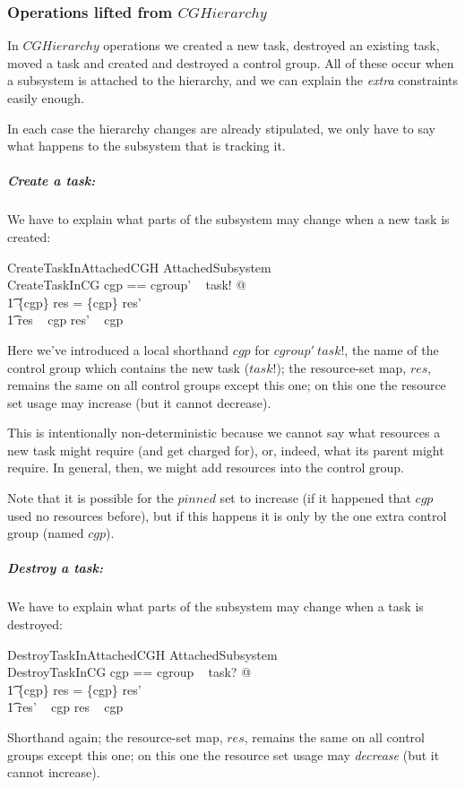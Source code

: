 \documentclass[a4paper,twoside,12pt]{article}
\begin{document}
\subsubsection{Operations lifted from $CGHierarchy$}

In $CGHierarchy$ operations we created a new task, destroyed an existing task, moved a task and created and destroyed
a control group.  All of these occur when a subsystem is attached to the hierarchy, and we can explain the \emph{extra}
constraints easily enough.

In each case the hierarchy changes are already stipulated, we only have to say what happens to the subsystem that is
tracking it.

\subparagraph{Create a task:}
We have to explain what parts of the subsystem may change when a new task is created:

\begin{schema}{CreateTaskInAttachedCGH}
\Delta AttachedSubsystem \\
CreateTaskInCG
\where
\LET cgp == cgroup' ~ task! @ \\
\t1 \{cgp\} \ndres res = \{cgp\} \ndres res' \land \\
\t1 res ~ cgp \subseteq res' ~ cgp
\end{schema}
Here we've introduced a local shorthand $cgp$ for $cgroup' ~ task!$, the name of the control group which contains
the new task ($task!$); the resource-set map, $res$, remains the same on all control groups except this one;
on this one the resource set usage may increase (but it cannot decrease).

This is intentionally non-deterministic because we cannot say what resources a new task might require (and get charged for), or, indeed, what its parent might require. In general, then, we might add resources into the control group.

Note that it is possible for the $pinned$ set to increase (if it happened that $cgp$ used no resources before), but if this happens it is only by the one extra control group (named $cgp$).

\subparagraph{Destroy a task:}
We have to explain what parts of the subsystem may change when a task is destroyed:

\begin{schema}{DestroyTaskInAttachedCGH}
\Delta AttachedSubsystem \\
DestroyTaskInCG
\where
\LET cgp == cgroup ~ task? @ \\
\t1 \{cgp\} \ndres res = \{cgp\} \ndres res' \land \\
\t1 res' ~ cgp \subseteq res ~ cgp
\end{schema}
Shorthand again;  the resource-set map, $res$, remains the same on all control groups except this one;
on this one the resource set usage may \emph{decrease} (but it cannot increase).
\end{document}
